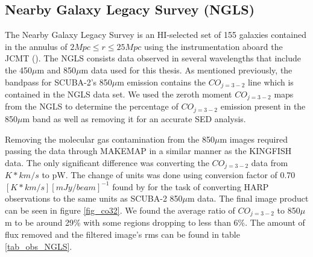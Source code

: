 \subsection{Nearby Galaxy Legacy Survey (NGLS)}

The Nearby Galaxy Legacy Survey is an HI-selected set of 155 galaxies contained in the annulus of $2Mpc\leq r \leq25Mpc$ using the instrumentation aboard the JCMT (\citep{wilson2012}).  The NGLS consists data observed in several wavelengths that include the 450$\mu$m and 850$\mu$m data used for this thesis.  As mentioned previously, the bandpass for SCUBA-2's 850$\mu$m emission contains the $CO_{j=3-2}$ line which is contained in the NGLS data set.  We used the zeroth moment $CO_{j=3-2}$ maps from the NGLS to determine the percentage of $CO_{j=3-2}$ emission present in the 850$\mu$m band as well as removing it for an accurate SED analysis.  

Removing the molecular gas contamination from the 850$\mu$m images required passing the data through MAKEMAP in a similar manner as the KINGFISH data.  The only significant difference was converting the $CO_{j=3-2}$ data from $K*km/s$ to pW.  The change of units was done using conversion factor of 0.70 $[K*km/s][mJy/beam]^{-1}$ found by \citep{drabek2012} for the task of converting HARP observations to the same units as SCUBA-2 850$\mu$m data.  The final image product can be seen in figure \ref{fig_co32}.  We found the average ratio of $CO_{j=3-2}$ to 850$\mu$m to be around 29\% with some regions dropping to less than 6\%.  The amount of flux removed and the filtered image's rms can be found in table \ref{tab_obs_NGLS}.

